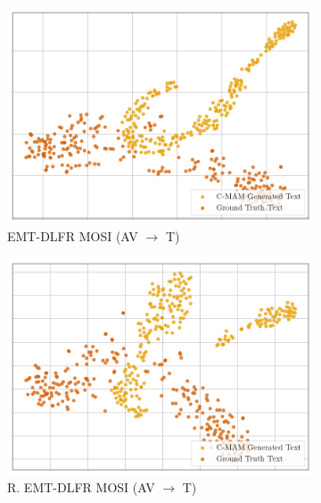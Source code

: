 \begin{figure}[!p]
    \begin{subfigure}[b]{0.24\textwidth}
        \centering
        \includegraphics[width=\textwidth]{imgs/tsne/emt_dlfr_baseline_mosi_tsne.png}
        \caption*{EMT-DLFR MOSI (AV $\rightarrow$ T)}
    \end{subfigure}
    \begin{subfigure}[b]{0.24\textwidth}
        \centering
        \includegraphics[width=\textwidth]{imgs/tsne/emt_dlfr_robust_baseline_mosi_tsne.png}
        \caption*{R. EMT-DLFR MOSI (AV $\rightarrow$ T)}
    \end{subfigure}
    \begin{subfigure}[b]{0.24\textwidth}
        \centering

\end{subfigure}
\end{figure}
